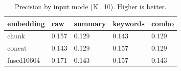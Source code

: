 \begin{table}
\caption{Precision by input mode (K=10). Higher is better.}
\label{tab:precision-by-mode}
\begin{tabular}{lllll}
\toprule
embedding & raw & summary & keywords & combo \\
\midrule
chunk & 0.157 & 0.129 & 0.143 & 0.129 \\
concat & 0.143 & 0.129 & 0.157 & 0.129 \\
fused10604 & 0.171 & 0.143 & 0.157 & 0.143 \\
\bottomrule
\end{tabular}
\end{table}

